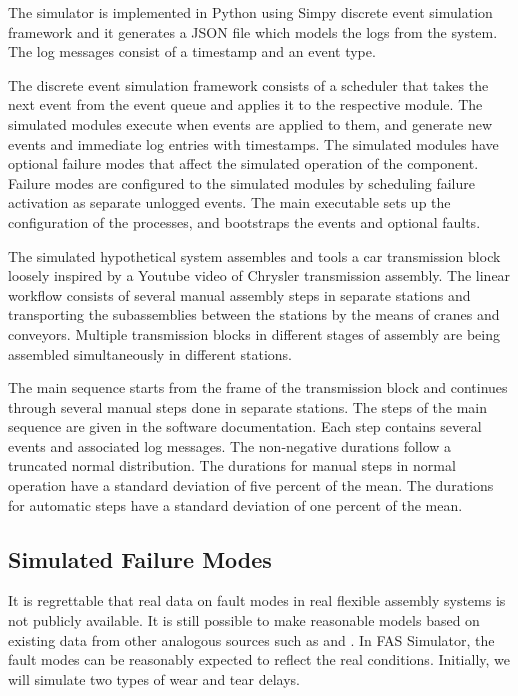 \documentclass[procedia]{easychair}
\begin{document}
The simulator is implemented in Python using Simpy discrete event simulation framework and it generates a JSON file which models the logs from the system.
The log messages consist of a timestamp and an event type.

The discrete event simulation framework consists of a scheduler that takes the next event from the event queue and applies it to the respective module. The simulated modules
execute when events are applied to them, and generate new events and immediate log entries with timestamps.
The simulated modules have optional failure modes that affect the simulated operation of the component. Failure modes are configured to the simulated modules
by scheduling failure activation as separate unlogged events.
The main executable sets up the configuration of the processes, and bootstraps the events and optional faults.

The simulated hypothetical system assembles and tools a car transmission block loosely inspired by a Youtube video of Chrysler transmission assembly\cite{transmission}.
The linear workflow consists of several manual assembly steps in separate stations and transporting the subassemblies between the stations by the means of
cranes and conveyors. Multiple transmission blocks in different stages of assembly are being assembled simultaneously in different stations.

The main sequence starts from the frame of the transmission block
and continues through several manual steps done in separate stations. The steps of the main sequence are given in the software documentation\cite{FASSimulator}.
Each step contains several events and associated log messages.
The non-negative durations follow a truncated normal distribution. The durations for manual steps in normal operation have a standard deviation of five percent of the mean. The durations for automatic steps
have a standard deviation of one percent of the mean.

\subsection{Simulated Failure Modes}
It is regrettable that real data on fault modes in real flexible assembly systems is not publicly available. It is still possible to make reasonable
models based on existing data from other analogous sources such as \cite{nasaames} and \cite{tsarouhas2009classification}. In FAS Simulator, the fault modes
can be reasonably expected to reflect the real conditions. Initially, we will simulate two types of wear and tear delays.
\end{document}
